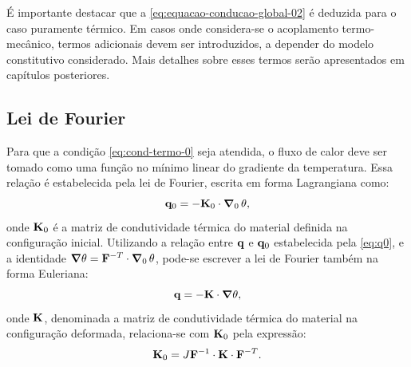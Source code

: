 \documentclass[Tese.tex]{subfiles}
\begin{document}

É importante destacar que a \cref{eq:equacao-conducao-global-02} é deduzida para o caso puramente térmico. Em casos onde considera-se o acoplamento termo-mecânico, termos adicionais devem ser introduzidos, a depender do modelo constitutivo considerado. Mais detalhes sobre esses termos serão apresentados em capítulos posteriores.

\subsection{Lei de Fourier}\label{subsec:fourier-0}

Para que a condição \eqref{eq:cond-termo-0} seja atendida, o fluxo de calor deve ser tomado como uma função no mínimo linear do gradiente da temperatura. Essa relação é estabelecida pela lei de Fourier, escrita em forma Lagrangiana como:
\begin{equation}\label{eq:fourier-0-term}
\mathbf{q}_0 = -\mathbf{K}_0\cdot\boldsymbol{\nabla}_0\,\theta,
\end{equation}
onde $\mathbf{K}_0$ é a matriz de condutividade térmica do material definida na configuração inicial. Utilizando a relação entre $\mathbf{q}$ e $\mathbf{q}_0$ estabelecida pela \cref{eq:q0}, e a identidade $\boldsymbol{\nabla}\theta = \mathbf{F}^{-T}\cdot\boldsymbol{\nabla}_0\,\theta$, pode-se escrever a lei de Fourier também na forma Euleriana:
\begin{equation}\label{eq:fourier-term}
\mathbf{q} = -\mathbf{K}\cdot\boldsymbol{\nabla}\theta,
\end{equation}
onde $\mathbf{K}$, denominada a matriz de condutividade térmica do material na configuração deformada, relaciona-se com $\mathbf{K}_0$ pela expressão:
\begin{equation}\label{eq:relacao-condut-term}
\mathbf{K}_0 = J \mathbf{F}^{-1}\cdot\mathbf{K}\cdot\mathbf{F}^{-T}.
\end{equation}
\end{document}
